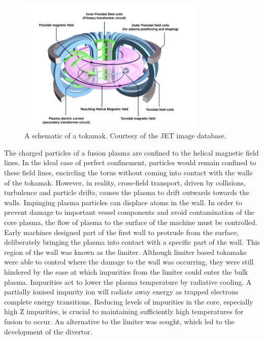 	\begin{figure}[H]
		\centering
		\includegraphics[width=0.8\textwidth]{tokamak}
		\caption{A schematic of a tokamak. Courtesy of the JET image database.}
		\label{fig:tokamak}
	\end{figure} 
	
	
	The charged particles of a fusion plasma are confined to the helical magnetic field lines. In the ideal case of perfect confinement, particles would remain confined to these field lines, encircling the torus without coming into contact with the walls of the tokamak. However, in reality, cross-field transport, driven by collisions, turbulence and particle drifts, causes the plasma to drift outwards towards the walls. Impinging plasma particles can displace atoms in the wall. In order to prevent damage to important vessel components and avoid contamination of the core plasma, the flow of plasma to the surface of the machine must be controlled. Early machines designed part of the first wall to protrude from the surface, deliberately bringing the plasma into contact with a specific part of the wall. This region of the wall was known as the limiter. Although limiter based tokamaks were able to control where the damage to the wall was occurring, they were still hindered by the ease at which impurities from the limiter could enter the bulk plasma. Impurities act to lower the plasma temperature by radiative cooling. A partially ionised impurity ion will radiate away energy as trapped electrons complete energy transitions. Reducing levels of impurities in the core, especially high Z impurities, is crucial to maintaining sufficiently high temperatures for fusion to occur. An alternative to the limiter was sought, which led to the development of the divertor. 
	
	
	
